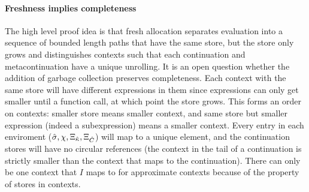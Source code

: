 {\paragraph{Freshness implies completeness}
The high level proof idea is that fresh allocation separates evaluation into a sequence of bounded length paths that have the same store, but the store only grows and distinguishes contexts such that each continuation and metacontinuation have a unique unrolling.
%
It is an open question whether the addition of garbage collection preserves completeness.
%
Each context with the same store will have different expressions in them since expressions can only get smaller until a function call, at which point the store grows.
%
This forms an order on contexts: smaller store means smaller context, and same store but smaller expression (indeed a subexpression) means a smaller context.
%
Every entry in each enviroment (${\hat\sigma},\chi,\Xi_{\hat{\kappa}},\Xi_{\hat{C}}$) will map to a unique element, and the continuation stores will have no circular references (the context in the tail of a continuation is strictly smaller than the context that maps to the continuation).
%
There can only be one context that $I$ maps to for approximate contexts because of the property of stores in contexts.

}
